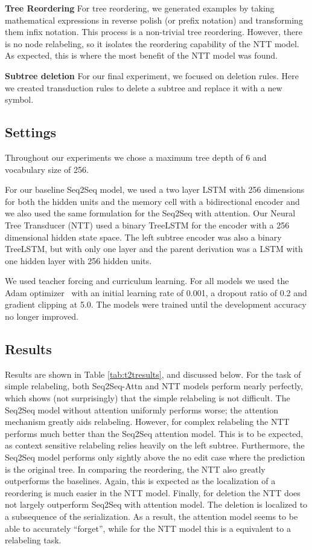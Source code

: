 \documentclass{article}
\newcommand{\jcs}[1]{\noindent{\textcolor{green}{\{{\bf jcs:} {\em #1}\}}}}
\begin{document}
%


{\bf Tree Reordering}
For tree reordering, we generated examples by taking mathematical expressions in reverse polish (or prefix notation) and transforming them infix notation. This process is a non-trivial tree reordering. However, there is no node relabeling, so it isolates the reordering capability of the NTT model. As expected, this is where the most benefit of the NTT model was found.

%

{\bf Subtree deletion}
For our final experiment, we focused on deletion rules. Here we created transduction rules to delete a subtree and replace it with a new symbol. %
%

\subsection{Settings}
Throughout our experiments we chose a maximum tree depth of 6 and vocabulary size of 256. 

For our baseline Seq2Seq model, we used a two layer LSTM with 256 dimensions for both the hidden units and the memory cell with a bidirectional encoder and we also used the same formulation for the Seq2Seq with attention. Our Neural Tree Transducer (NTT) used a binary TreeLSTM for the encoder with a 256 dimensional hidden state space. The left subtree encoder was also a binary TreeLSTM, but with only one layer and the parent derivation was a LSTM with one hidden layer with 256 hidden units. 

We used teacher forcing and curriculum learning. For all models we used the Adam optimizer~\citep{kingma2014adam} with an initial learning rate of 0.001,  a dropout ratio of 0.2 and gradient clipping at 5.0. The models were trained until the development accuracy no longer improved. 


\subsection{Results}
Results are shown in Table \ref{tab:t2tresults}, and discussed below.
For the task of simple relabeling, both Seq2Seq-Attn and NTT models perform nearly perfectly, which shows (not surprisingly) that the simple relabeling is not difficult. The Seq2Seq model without attention uniformly performs worse; the attention mechanism greatly aids relabeling. However, for complex relabeling the NTT performs much better than the Seq2Seq attention model. This is to be expected, as context sensitive relabeling relies heavily on the left subtree. Furthermore, the Seq2Seq model performs only sightly above the no edit case where the prediction is the original tree. In comparing the reordering, the NTT also greatly outperforms the baselines. Again, this is expected as the localization of a reordering is much easier in the NTT model. Finally, for deletion the NTT does not largely outperform Seq2Seq with attention model. The deletion is localized to a subsequence of the serialization. As a result, the attention model seems to be able to accurately ``forget'', while for the NTT model this is a equivalent to a relabeling task.
\end{document}
